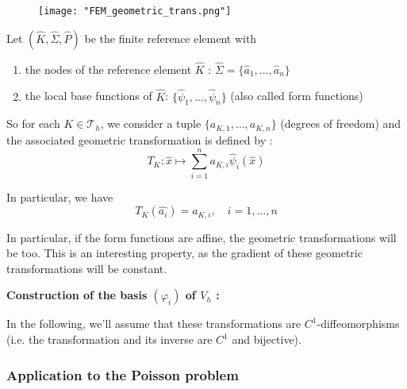 \begin{figure}[H]
	\centering
	\texttt{[image: "FEM\_geometric\_trans.png"]}
	\label{trans_geo}
\end{figure}

Let $(\hat{K},\hat{\Sigma},\hat{P})$ be the finite reference element with 
\begin{enumerate}[label=\textbullet]
	\item the nodes of the reference element $\hat{K}$ : $\hat{\Sigma}=\{\hat{a}_1,\dots,\hat{a}_n\}$
	\item the local base functions of $\hat{K}$: $\{\hat{\psi}_1,\dots,\hat{\psi}_n\}$ (also called form functions)
\end{enumerate}

So for each $K\in\mathcal{T}_h$, we consider a tuple $\{a_{K,1},\dots,a_{K,n}\}$ (degrees of freedom) and the associated geometric transformation is defined by :
\begin{equation*}
	T_K : \hat{x}\mapsto\sum_{i=1}^{n}a_{K,i}\hat{\psi}_i(\hat{x})
\end{equation*}

In particular, we have
\begin{equation*}
	T_K(\hat{a_i})=a_{K,i}, \quad i=1,\dots,n
\end{equation*}

\begin{Rem}
	In particular, if the form functions are affine, the geometric transformations will be too. This is an interesting property, as the gradient of these geometric transformations will be constant.
\end{Rem}

\textbf{Construction of the basis $(\varphi_i)$ of $V_h$ :}


\begin{Rem}
	In the following, we'll assume that these transformations are $C^1$-diffeomorphisms (i.e. the transformation and its inverse are $C^1$ and bijective).
\end{Rem}

\subsubsection{Application to the Poisson problem}



